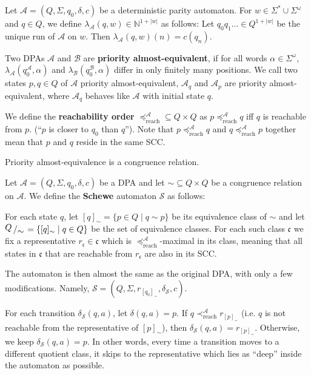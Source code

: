 



\begin{defn}
	Let $\mathcal{A} = (Q, \Sigma, q_0, \delta, c)$ be a deterministic parity automaton. For $w \in \Sigma^* \cup \Sigma^\omega$ and $q \in Q$, we define $\lambda_\mathcal{A}(q, w) \in \mathbb{N}^{1+|w|}$ as follows: Let $q_0 q_1 \dots \in Q^{1+|w|}$ be the unique run of $\mathcal{A}$ on $w$. Then $\lambda_\mathcal{A}(q, w)(n) = c(q_n)$.
	
	Two DPAs $\mathcal{A}$ and $\mathcal{B}$ are \textbf{priority almost-equivalent}, if for all words $\alpha \in \Sigma^\omega$, $\lambda_\mathcal{A}(q_0^\mathcal{A}, \alpha)$ and $\lambda_\mathcal{B}(q_0^\mathcal{B}, \alpha)$ differ in only finitely many positions.
	We call two states $p, q \in Q$ of $\mathcal{A}$ priority almost-equivalent, $\mathcal{A}_q$ and $\mathcal{A}_p$ are priority almost-equivalent, where $\mathcal{A}_q$ behaves like $\mathcal{A}$ with initial state $q$.
	
	We define the \textbf{reachability order} $\preceq_\text{reach}^\mathcal{A} \subseteq Q \times Q$ as $p \preceq_\text{reach}^\mathcal{A} q$ iff $q$ is reachable from $p$. (\enquote{$p$ is closer to $q_0$ than $q$}). Note that $p \preceq_\text{reach}^\mathcal{A} q$ and $q \preceq_\text{reach}^\mathcal{A} p$ together mean that $p$ and $q$ reside in the same SCC.
\end{defn}

\begin{lem}
	Priority almost-equivalence is a congruence relation.
\end{lem}

\begin{defn}
	Let $\mathcal{A} = (Q, \Sigma, q_0, \delta, c)$ be a DPA and let $\sim \subseteq Q \times Q$ be a congruence relation on $\mathcal{A}$. We define the \textbf{Schewe} automaton $\mathcal{S}$ as follows:
	
	For each state $q$, let $[q]_\sim = \{ p \in Q \mid q \sim p \}$ be its equivalence class of $\sim$ and let $\bigslant{Q}{\sim} = \{[q]_\sim \mid q \in Q\}$ be the set of equivalence classes. For each such class $\mathfrak{c}$ we fix a representative $r_\mathfrak{c} \in \mathfrak{c}$ which is $\preceq_\text{reach}^\mathcal{A}$-maximal in its class, meaning that all states in $\mathfrak{c}$ that are reachable from $r_\mathfrak{c}$ are also in its SCC. 
	
	The automaton is then almost the same as the original DPA, with only a few modifications. Namely, $\mathcal{S} = (Q, \Sigma, r_{[q_0]_\sim}, \delta_\mathcal{S}, c)$.
	
	For each transition $\delta_\mathcal{S}(q, a)$, let $\delta(q, a) = p$. If $q \prec_\text{reach}^\mathcal{A} r_{[p]_\sim}$ (i.e. $q$ is not reachable from the representative of $[p]_\sim$), then $\delta_\mathcal{S}(q, a) = r_{[p]_\sim}$. Otherwise, we keep $\delta_\mathcal{S}(q, a) = p$. In other words, every time a transition moves to a different quotient class, it skips to the representative which lies as \enquote{deep} inside the automaton as possible.
\end{defn}

